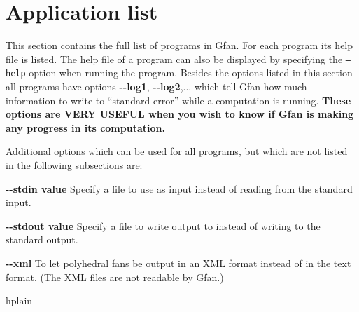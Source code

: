 




\newpage
\appendix

\newpage
\section{Application list}
\label{sec:applist}
This section contains the full list of programs in Gfan. For each program its help file is listed. The help file of a program can also be displayed by specifying the \texttt{--help} option when running the program. Besides the options listed in this section all programs have options {\bf -\hspace{0.013cm}-log1}, {\bf -\hspace{0.013cm}-log2},... which tell Gfan how much information to write to ``standard error'' while a computation is running. {\bf These options are VERY USEFUL when you wish to know if Gfan is making any progress in its computation.}

Additional options which can be used for all programs, but which are not listed in the following subsections are:
\begin{description}
\item{\bf -\hspace{0.013cm}-stdin value} Specify a file to use as input instead of reading from the standard input.
\item{\bf -\hspace{0.013cm}-stdout value} Specify a file to write output to instead of writing to the standard output.
\item{\bf -\hspace{0.013cm}-xml} To let polyhedral fans be output in an XML format instead of in the text format. (The XML files are not readable by Gfan.)
\end{description}


\newpage
 {hplain}















































































